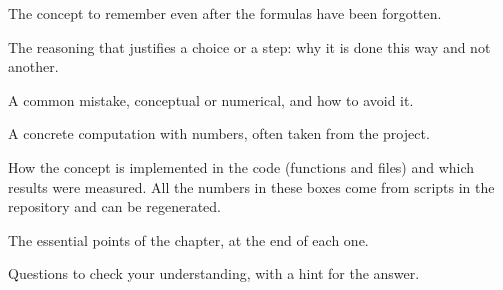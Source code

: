 \begin{idea}
The concept to remember even after the formulas have been forgotten.
\end{idea}
\begin{perche}
The reasoning that justifies a choice or a step: why it is done this way and not another.
\end{perche}
\begin{attenzione}
A common mistake, conceptual or numerical, and how to avoid it.
\end{attenzione}
\begin{esempio}
A concrete computation with numbers, often taken from the project.
\end{esempio}
\begin{progetto}
How the concept is implemented in the code (functions and files) and which results were measured. All the numbers
in these boxes come from scripts in the repository and can be regenerated.
\end{progetto}
\begin{riassunto}
The essential points of the chapter, at the end of each one.
\end{riassunto}
\begin{domande}
Questions to check your understanding, with a hint for the answer.
\end{domande}

